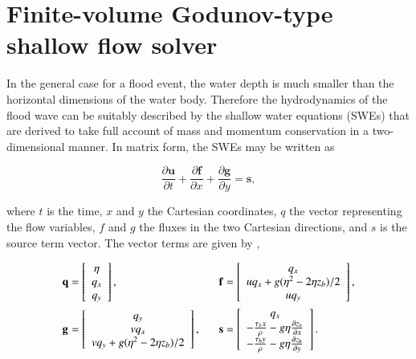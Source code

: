 \documentclass[11pt,english,a4paper]{article}
\begin{document}
\section{Finite-volume Godunov-type shallow flow solver}

In the general case for a flood event, the water depth is much smaller than the horizontal dimensions of the water body. Therefore the hydrodynamics of the flood wave can be suitably described by the shallow water equations (SWEs) that are derived to take full account of mass and momentum conservation in a two-dimensional manner. In matrix form, the SWEs may be written as

\begin{equation}
	\label{SWE_1stO}
	\frac{\partial\textbf{u}}{\partial t} +
	\frac{\partial\textbf{f}}{\partial x} +
	\frac{\partial\textbf{g}}{\partial y} =
	\textbf{s} ,
\end{equation}

where $t$ is the time, $x$ and $y$ the Cartesian coordinates, $q$ the vector representing the flow variables, $f$ and $g$ the fluxes in the two Cartesian directions, and $s$ is the source term vector. The vector terms are given by \citet{Liang2009b},

\renewcommand{\arraystretch}{1.5}
\begin{equation}
	\label{SWETerms_1stO}
	\begin{alignedat}{4}
		&\textbf q && = \left[ \begin{array}{c}
			\eta \\
			q_x \\
			q_y
		\end{array} \right] , \hspace{4ex} &
		&\textbf f &&  = \left[ \begin{array}{c}
			q_x \\
			uq_x + g(\eta^2 - 2\eta z_b)/2 \\
			uq_y
		\end{array} \right] ,\\
		&\textbf g && = \left[ \begin{array}{c}
			q_y \\
 			vq_x \\
			vq_y + g(\eta^2 - 2\eta z_b)/2 \\
		\end{array} \right] , \hspace{4ex} &
		&\textbf s && = \left[ \begin{array}{c}
			q_s \\
			-\frac{\tau_bx}{\rho} - g\eta \frac{\partial z_b}{\partial x} \\
			-\frac{\tau_by}{\rho} - g\eta \frac{\partial z_b}{\partial y} \\
		\end{array} \right] .
	\end{alignedat}
\end{equation}
\end{document}
